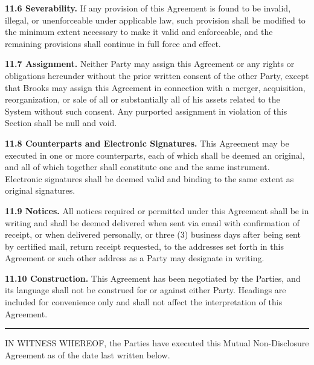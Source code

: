 \documentclass{article}
\begin{document}
\textbf{11.6 Severability.} If any provision of this Agreement is found to be invalid, illegal, or unenforceable under applicable law, such provision shall be modified to the minimum extent necessary to make it valid and enforceable, and the remaining provisions shall continue in full force and effect.

\textbf{11.7 Assignment.} Neither Party may assign this Agreement or any rights or obligations hereunder without the prior written consent of the other Party, except that Brooks may assign this Agreement in connection with a merger, acquisition, reorganization, or sale of all or substantially all of his assets related to the System without such consent. Any purported assignment in violation of this Section shall be null and void.

\textbf{11.8 Counterparts and Electronic Signatures.} This Agreement may be executed in one or more counterparts, each of which shall be deemed an original, and all of which together shall constitute one and the same instrument. Electronic signatures shall be deemed valid and binding to the same extent as original signatures.

\textbf{11.9 Notices.} All notices required or permitted under this Agreement shall be in writing and shall be deemed delivered when sent via email with confirmation of receipt, or when delivered personally, or three (3) business days after being sent by certified mail, return receipt requested, to the addresses set forth in this Agreement or such other address as a Party may designate in writing.

\textbf{11.10 Construction.} This Agreement has been negotiated by the Parties, and its language shall not be construed for or against either Party. Headings are included for convenience only and shall not affect the interpretation of this Agreement.

\vspace{2em}
\begin{center}
\rule{12cm}{0.4pt}
\end{center}
\vspace{1em}

\noindent IN WITNESS WHEREOF, the Parties have executed this Mutual Non-Disclosure Agreement as of the date last written below.

\vspace{2em}
\end{document}
